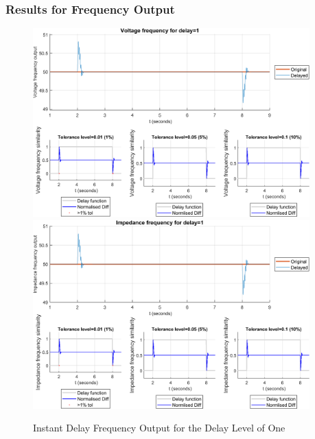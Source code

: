 \subsubsection{Results for Frequency Output}
\begin{figure}
    \caption{Instant Delay Frequency Output for the Delay Level of One}
    \includegraphics[width=0.95\textwidth]{PMUsim-figures/DelayOf_1/Instant_vFrequency.png}    
  \includegraphics[width=0.95\textwidth]{PMUsim-figures/DelayOf_1/Instant_iFrequency.png}    
    \label{fig:PMUsim_One_Frequency}
        \begin{small}
     \end{small}
\end{figure}

